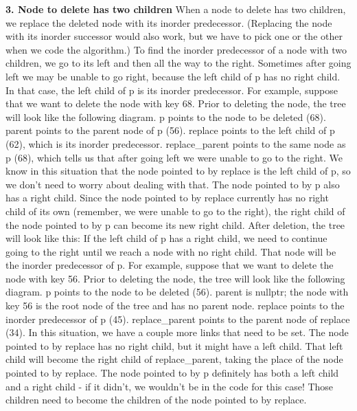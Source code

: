 \documentclass{report}
\begin{document}
    \bigbreak \noindent 
    \textbf{3. Node to delete has two children}
    \bigbreak \noindent 
    When a node to delete has two children, we replace the deleted node with its inorder predecessor. (Replacing the node with its inorder successor would also work, but we have to pick one or the other when we code the algorithm.) To find the inorder predecessor of a node with two children, we go to its left and then all the way to the right.
    \bigbreak \noindent 
    Sometimes after going left we may be unable to go right, because the left child of p has no right child. In that case, the left child of p is its inorder predecessor.
    \bigbreak \noindent 
    For example, suppose that we want to delete the node with key 68. Prior to deleting the node, the tree will look like the following diagram. p points to the node to be deleted (68). parent points to the parent node of p (56). replace points to the left child of p (62), which is its inorder predecessor. replace\_parent points to the same node as p (68), which tells us that after going left we were unable to go to the right.
    \bigbreak \noindent 
    We know in this situation that the node pointed to by replace is the left child of p, so we don't need to worry about dealing with that. The node pointed to by p also has a right child. Since the node pointed to by replace currently has no right child of its own (remember, we were unable to go to the right), the right child of the node pointed to by p can become its new right child.
    \bigbreak \noindent 
    \bigbreak \noindent 
    After deletion, the tree will look like this:
    \bigbreak \noindent 
    If the left child of p has a right child, we need to continue going to the right until we reach a node with no right child. That node will be the inorder predecessor of p.
    \bigbreak \noindent 
    For example, suppose that we want to delete the node with key 56. Prior to deleting the node, the tree will look like the following diagram. p points to the node to be deleted (56). parent is nullptr; the node with key 56 is the root node of the tree and has no parent node. replace points to the inorder predecessor of p (45). replace\_parent points to the parent node of replace (34).
    \bigbreak \noindent 
    In this situation, we have a couple more links that need to be set. The node pointed to by replace has no right child, but it might have a left child. That left child will become the right child of replace\_parent, taking the place of the node pointed to by replace.
    \bigbreak \noindent 
    The node pointed to by p definitely has both a left child and a right child - if it didn't, we wouldn't be in the code for this case! Those children need to become the children of the node pointed to by replace.
    \bigbreak \noindent 
\end{document}
